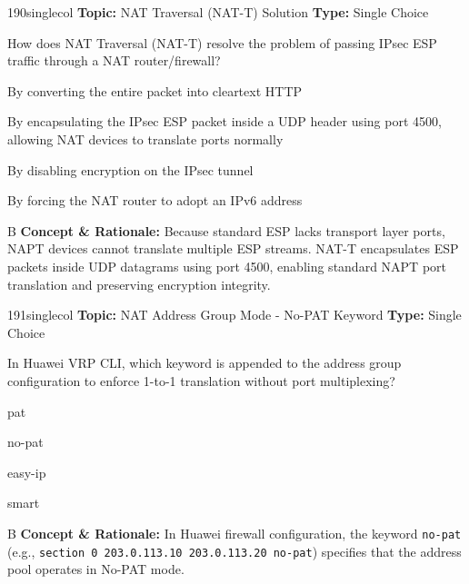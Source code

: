 \begin{qcard}{190}{singlecol}
\textcolor{darkslate!75}{\small\textbf{Topic:} NAT Traversal (NAT-T) Solution \hfill \textbf{Type:} Single Choice}\vspace{0.4em}\par
How does NAT Traversal (NAT-T) resolve the problem of passing IPsec ESP traffic through a NAT router/firewall?
\begin{qoptions}
\item By converting the entire packet into cleartext HTTP
\item By encapsulating the IPsec ESP packet inside a UDP header using port 4500, allowing NAT devices to translate ports normally
\item By disabling encryption on the IPsec tunnel
\item By forcing the NAT router to adopt an IPv6 address
\end{qoptions}
\end{qcard}
\nopagebreak
\begin{explainbox}{B}
\textbf{Concept \& Rationale:} Because standard ESP lacks transport layer ports, NAPT devices cannot translate multiple ESP streams. NAT-T encapsulates ESP packets inside UDP datagrams using port 4500, enabling standard NAPT port translation and preserving encryption integrity.
\end{explainbox}

\begin{qcard}{191}{singlecol}
\textcolor{darkslate!75}{\small\textbf{Topic:} NAT Address Group Mode - No-PAT Keyword \hfill \textbf{Type:} Single Choice}\vspace{0.4em}\par
In Huawei VRP CLI, which keyword is appended to the address group configuration to enforce 1-to-1 translation without port multiplexing?
\begin{qoptions}
\item pat
\item no-pat
\item easy-ip
\item smart
\end{qoptions}
\end{qcard}
\nopagebreak
\begin{explainbox}{B}
\textbf{Concept \& Rationale:} In Huawei firewall configuration, the keyword \texttt{no-pat} (e.g., \texttt{section 0 203.0.113.10 203.0.113.20 no-pat}) specifies that the address pool operates in No-PAT mode.
\end{explainbox}

